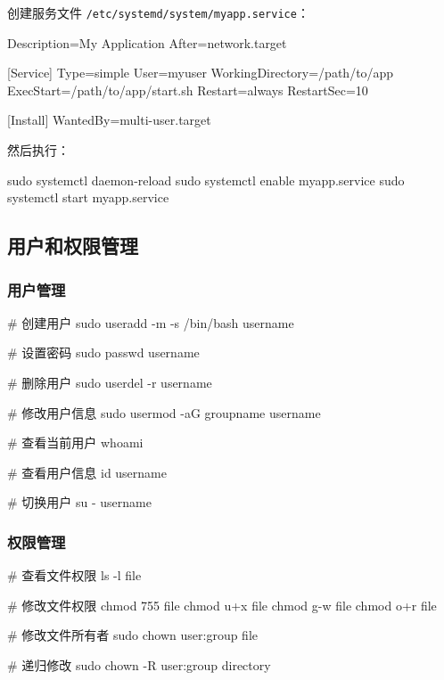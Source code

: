 创建服务文件 \lstinline{/etc/systemd/system/myapp.service}：

\begin{lstcode}[numbers=none]
[Unit]
Description=My Application
After=network.target

[Service]
Type=simple
User=myuser
WorkingDirectory=/path/to/app
ExecStart=/path/to/app/start.sh
Restart=always
RestartSec=10

[Install]
WantedBy=multi-user.target
\end{lstcode}

然后执行：

\begin{lstcode}[numbers=none]
  sudo systemctl daemon-reload
  sudo systemctl enable myapp.service
  sudo systemctl start myapp.service
\end{lstcode}

\subsection{用户和权限管理}

\subsubsection{用户管理}


\begin{lstcode}[numbers=none]
  # 创建用户
  sudo useradd -m -s /bin/bash username

  # 设置密码
  sudo passwd username

  # 删除用户
  sudo userdel -r username

  # 修改用户信息
  sudo usermod -aG groupname username

  # 查看当前用户
  whoami

  # 查看用户信息
  id username

  # 切换用户
  su - username
\end{lstcode}

\subsubsection{权限管理}


\begin{lstcode}[numbers=none]
  # 查看文件权限
  ls -l file

  # 修改文件权限
  chmod 755 file
  chmod u+x file
  chmod g-w file
  chmod o+r file

  # 修改文件所有者
  sudo chown user:group file

  # 递归修改
  sudo chown -R user:group directory
\end{lstcode}


